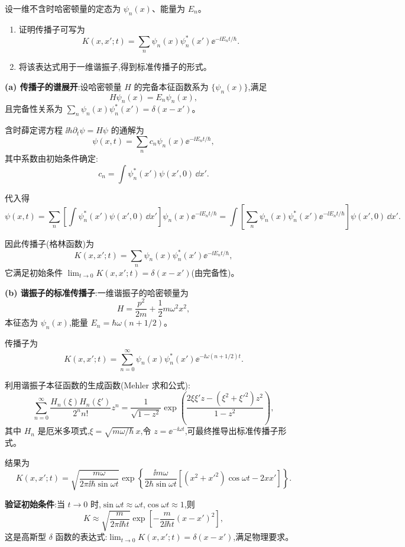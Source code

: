 \begin{question}
设一维不含时哈密顿量的定态为 $\psi_n(x)$、能量为 $E_n$。
\begin{enumerate}
\item 证明传播子可写为
\[
K(x,x';t)=\sum_n\psi_n(x)\psi_n^*(x')\ee^{-\ii E_nt/\hbar}.
\]
\item 将该表达式用于一维谐振子,得到标准传播子的形式。
\end{enumerate}
\end{question}
\begin{solution}
	\textbf{(a) 传播子的谱展开}:设哈密顿量 $H$ 的完备本征函数系为 $\{\psi_n(x)\}$,满足
	\[
	H\psi_n(x) = E_n\psi_n(x),
	\]
	且完备性关系为 $\sum_n \psi_n(x)\psi_n^*(x') = \delta(x-x')$。

	含时薛定谔方程 $\ii\hbar\partial_t\psi=H\psi$ 的通解为
	\[
	\psi(x,t) = \sum_n c_n\psi_n(x)\ee^{-\ii E_n t/\hbar},
	\]
	其中系数由初始条件确定:
	\[
	c_n = \int \psi_n^*(x')\psi(x',0)\,\dd x'.
	\]

	代入得
	\[
	\psi(x,t) = \sum_n \left[\int \psi_n^*(x')\psi(x',0)\,\dd x'\right]\psi_n(x)\ee^{-\ii E_n t/\hbar}
	= \int \left[\sum_n \psi_n(x)\psi_n^*(x')\ee^{-\ii E_n t/\hbar}\right] \psi(x',0)\,\dd x'.
	\]

	因此传播子(格林函数)为
	\[
	K(x,x';t) = \sum_n \psi_n(x)\psi_n^*(x')\ee^{-\ii E_n t/\hbar},
	\]
	它满足初始条件 $\lim_{t\to0} K(x,x';t)=\delta(x-x')$(由完备性)。

	\textbf{(b) 谐振子的标准传播子}:一维谐振子的哈密顿量为
	\[
	H = \frac{p^2}{2m} + \frac12 m\omega^2 x^2,
	\]
	本征态为 $\psi_n(x)$,能量 $E_n = \hbar\omega(n+1/2)$。

	传播子为
	\[
	K(x,x';t) = \sum_{n=0}^\infty \psi_n(x)\psi_n^*(x') \ee^{-\ii\omega(n+1/2)t}.
	\]

	利用谐振子本征函数的生成函数(Mehler 求和公式):
	\[
	\sum_{n=0}^\infty \frac{H_n(\xi)H_n(\xi')}{2^n n!}z^n = \frac{1}{\sqrt{1-z^2}}\exp\!\left(\frac{2\xi\xi'z-(\xi^2+\xi'^2)z^2}{1-z^2}\right),
	\]
	其中 $H_n$ 是厄米多项式,$\xi = \sqrt{m\omega/\hbar}\,x$,令 $z=\ee^{-\ii\omega t}$,可最终推导出标准传播子形式。

	结果为
	\[
	\boxed{K(x,x';t) = \sqrt{\frac{m\omega}{2\pi\ii\hbar\sin\omega t}}
	\exp\!\left\{\frac{\ii m\omega}{2\hbar\sin\omega t}
	\left[(x^2+x'^2)\cos\omega t - 2xx'\right]\right\}}.
	\]

	\textbf{验证初始条件}:当 $t\to0$ 时,$\sin\omega t \approx \omega t$,$\cos\omega t \approx 1$,则
	\[
	K \approx \sqrt{\frac{m}{2\pi\ii\hbar t}} \exp\!\left[-\frac{m}{2\ii\hbar t}(x-x')^2\right],
	\]
	这是高斯型 $\delta$ 函数的表达式:$\lim_{t\to0} K(x,x';t) = \delta(x-x')$,满足物理要求。
	\end{solution}

